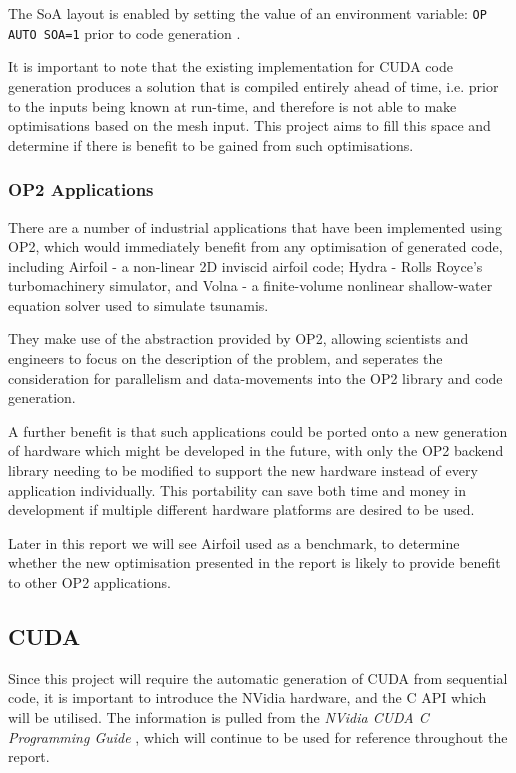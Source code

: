 \noindent The SoA layout is enabled by setting the value of an environment variable: \verb|OP AUTO SOA=1| prior to code generation \cite[p13]{manual}.
\par
It is important to note that the existing implementation for CUDA code generation produces a solution that is compiled entirely ahead of time, i.e. prior to the inputs being known at run-time, and therefore is not able to make optimisations based on the mesh input. This project aims to fill this space and determine if there is benefit to be gained from such optimisations.

\subsubsection{OP2 Applications}
There are a number of industrial applications that have been implemented using OP2, which would immediately benefit from any optimisation of generated code, including Airfoil \cite{airfoil} - a non-linear 2D inviscid airfoil code; Hydra \cite{hydra} - Rolls Royce’s turbomachinery simulator, and Volna \cite{volna} - a finite-volume nonlinear shallow-water equation solver used to simulate tsunamis.
\par
They make use of the abstraction provided by OP2, allowing scientists and engineers to focus on the description of the problem, and seperates the consideration for parallelism and data-movements into the OP2 library and code generation.
\par
A further benefit is that such applications could be ported onto a new generation of hardware which might be developed in the future, with only the OP2 backend library needing to be modified to support the new hardware instead of every application individually. This portability can save both time and money in development if multiple different hardware platforms are desired to be used.
\par
Later in this report we will see Airfoil used as a benchmark, to determine whether the new optimisation presented in the report is likely to provide benefit to other OP2 applications.

\subsection{CUDA}
Since this project will require the automatic generation of CUDA from sequential code, it is important to introduce the NVidia hardware, and the C API which will be utilised. The information is pulled from the \textit{NVidia CUDA C Programming Guide} \cite{guide}, which will continue to be used for reference throughout the report.

